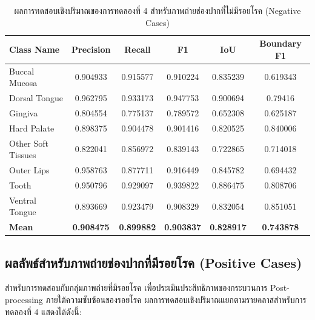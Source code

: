\begin{table}[H]
\centering
\caption{ผลการทดสอบเชิงปริมาณของการทดลองที่ 4 สำหรับภาพถ่ายช่องปากที่ไม่มีรอยโรค (Negative Cases)}
\label{tab:eval_postprocessing_negative}
\begin{tabular}{|l|c|c|c|c|c|}
\hline
\textbf{Class Name} & \textbf{Precision} & \textbf{Recall} & \textbf{F1} & \textbf{IoU} & \textbf{Boundary F1} \\ \hline
Buccal Mucosa & 0.904933 & 0.915577 & 0.910224 & 0.835239 & 0.619343 \\
Dorsal Tongue & 0.962795 & 0.933173 & 0.947753 & 0.900694 & 0.79416 \\
Gingiva & 0.804554 & 0.775137 & 0.789572 & 0.652308 & 0.625187 \\
Hard Palate & 0.898375 & 0.904478 & 0.901416 & 0.820525 & 0.840006 \\
Other Soft Tissues & 0.822041 & 0.856972 & 0.839143 & 0.722865 & 0.714018 \\
Outer Lips & 0.958763 & 0.877711 & 0.916449 & 0.845782 & 0.694432 \\
Tooth & 0.950796 & 0.929097 & 0.939822 & 0.886475 & 0.808706 \\
Ventral Tongue & 0.893669 & 0.923479 & 0.908329 & 0.832054 & 0.851051 \\ \hline
\textbf{Mean} & \textbf{0.908475} & \textbf{0.899882} & \textbf{0.903837} & \textbf{0.828917} & \textbf{0.743878} \\ \hline
\end{tabular}
\end{table}

\subsection{ผลลัพธ์สำหรับภาพถ่ายช่องปากที่มีรอยโรค (Positive Cases)}
สำหรับการทดสอบกับกลุ่มภาพถ่ายที่มีรอยโรค เพื่อประเมินประสิทธิภาพของกระบวนการ Post-processing ภายใต้ความซับซ้อนของรอยโรค ผลการทดสอบเชิงปริมาณแยกตามรายคลาสสำหรับการทดลองที่ 4 แสดงได้ดังนี้:

